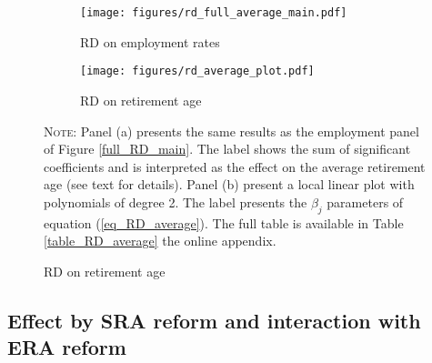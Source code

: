 \documentclass[12pt,a4paper]{article}
\begin{document}

\vspace{0.2cm}
\begin{figure}[H]
	\begin{adjustwidth}{-1in}{-1in}	
\caption{Effect on average retirement age: comparison of two approaches}
\label{rd_comparison}
\centering
\begin{subfigure}{0.65\textwidth}
\centering
\caption{RD on employment rates}
\texttt{[image: figures/rd\_full\_average\_main.pdf]} %
\label{rd_comparison1}
\end{subfigure}%
\begin{subfigure}{0.65\textwidth}
\centering
\caption{RD on retirement age}
\texttt{[image: figures/rd\_average\_plot.pdf]} 	
\label{rd_comparison2}
\end{subfigure}
\begin{minipage}{15cm}%
\footnotesize
	\textsc{Note:} Panel (a) presents the same results as the employment panel of Figure \ref{full_RD_main}. The label shows the sum of significant coefficients and is interpreted as the effect on the average retirement age (see text for details). Panel (b) present a local linear plot with polynomials of degree 2. The label presents the $\beta_j$ parameters of equation (\ref{eq_RD_average}). The full table is available in Table \ref{table_RD_average} the online appendix. 
\end{minipage}%
\end{adjustwidth}
\end{figure}

\subsection{Effect by SRA reform and interaction with ERA reform}
\label{sec_result_cutoff}
\end{document}
